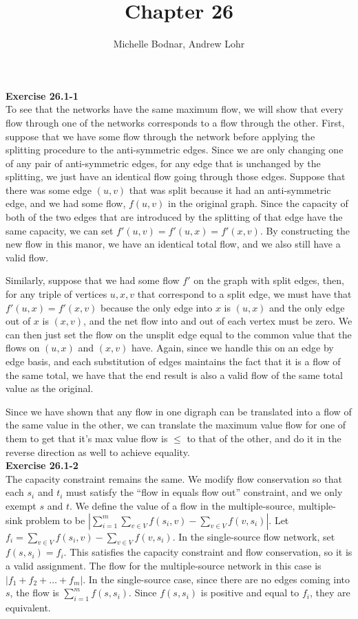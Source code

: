 \documentclass{article}
\title{Chapter 26}
\author{Michelle Bodnar, Andrew Lohr}
\begin{document}
\maketitle

\noindent\textbf{Exercise 26.1-1}\\

To see that the networks have the same maximum flow, we will show that every flow through one of the networks corresponds to a flow through the other. First, suppose that we have some flow through the network before applying the splitting procedure to the anti-symmetric edges. Since we are only changing one of any pair of anti-symmetric edges, for any edge that is unchanged by the splitting, we just have an identical flow going through those edges. Suppose that there was some edge $(u,v)$ that was split because it had an anti-symmetric edge, and we had some flow, $f(u,v)$ in the original graph. Since the capacity of both of the two edges that are introduced by the splitting of that edge have the same capacity, we can set $f'(u,v) = f'(u,x) = f'(x,v)$. By constructing the new flow in this manor, we have an identical total flow, and we also still have a valid flow.

Similarly, suppose that we had some flow $f'$ on the graph with split edges, then, for any triple of vertices $u,x,v$ that correspond to a split edge, we must have that $f'(u,x) = f'(x,v)$ because the only edge into $x$ is $(u,x)$ and the only edge out of $x$ is $(x,v)$, and the net flow into and out of each vertex must be zero. We can then just set the flow on the unsplit edge equal to the common value that the flows on $(u,x)$ and $(x,v)$ have. Again, since we handle this on an edge by edge basis, and each substitution of edges maintains the fact that it is a flow of the same total, we have that the end result is also a valid flow of the same total value as the original.

Since we have shown that any flow in one digraph can be translated into a flow of the same value in the other, we can translate the maximum value flow for one of them to get that it's max value flow is $\le$ to that of the other, and do it in the reverse direction as well to achieve equality.\\

\noindent\textbf{Exercise 26.1-2}\\

The capacity constraint remains the same.  We modify flow conservation so that each $s_i$ and $t_i$ must satisfy the ``flow in equals flow out'' constraint, and we only exempt $s$ and $t$.  We define the value of a flow in the multiple-source, multiple-sink problem to be $\left|\sum_{i=1}^m \sum_{v\in V} f(s_i,v) - \sum_{v\in V} f(v,s_i)\right|$.  Let $f_i =  \sum_{v\in V} f(s_i,v) - \sum_{v\in V} f(v,s_i)$.  In the single-source flow network, set $f(s, s_i) = f_i$.  This satisfies the capacity constraint and flow conservation, so it is a valid assignment.  The flow for the multiple-source network in this case is $|f_1 + f_2 + \dots + f_m|$.  In the single-source case, since there are no edges coming into $s$, the flow is $\sum_{i=1}^m f(s,s_i)$.  Since $f(s,s_i)$ is positive and equal to $f_i$, they are equivalent. \\
\end{document}

